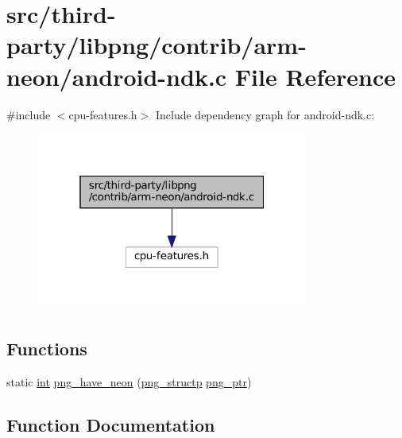 \hypertarget{android-ndk_8c}{}\section{src/third-\/party/libpng/contrib/arm-\/neon/android-\/ndk.c File Reference}
\label{android-ndk_8c}
{\ttfamily \#include $<$cpu-\/features.\+h$>$}\newline
Include dependency graph for android-\/ndk.c\+:
\nopagebreak
\begin{figure}[H]
\begin{center}
\leavevmode
\includegraphics[width=253pt]{android-ndk_8c__incl}
\end{center}
\end{figure}
\subsection*{Functions}
\begin{DoxyCompactItemize}
\item 
static \mbox{\hyperlink{ioapi_8h_a787fa3cf048117ba7123753c1e74fcd6}{int}} \mbox{\hyperlink{android-ndk_8c_a07e715fb224e41ff1a5ccbeebdb16369}{png\+\_\+have\+\_\+neon}} (\mbox{\hyperlink{png_8h_a05b958915368d6bbd797ef70f24b9ff6}{png\+\_\+structp}} \mbox{\hyperlink{_png_file_8c_a55aeeb404d5f026787361dda7a4f1cb8}{png\+\_\+ptr}})
\end{DoxyCompactItemize}


\subsection{Function Documentation}
\mbox{\label{android-ndk_8c_a07e715fb224e41ff1a5ccbeebdb16369}} 
